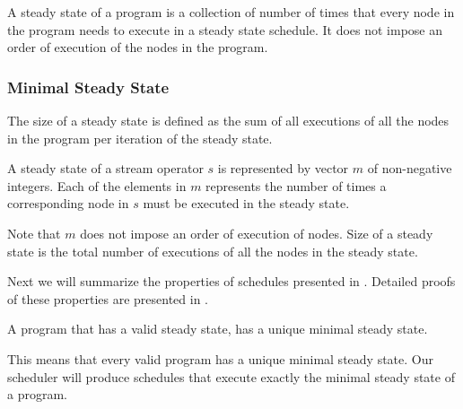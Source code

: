 A steady state of a program is a collection of number of times
that every node in the program needs to execute in a steady state
schedule.  It does not impose an order of execution of the nodes
in the program.
\begin{comment}
Not every {\StreamIt} program has a steady state schedule.  It is
possible for a program to have unbalanced production and
consumption of data in {\splitjoins} and {\feedbackloops}. The
amount of data buffered continually increases, and cannot be
reduced, thus making it impossible to create a steady state
schedule for them.  It is also possible that a {\feedbackloop}
does not have enough data buffered up internally in order to
complete execution of a full steady state, and thus deadlocks.
Programs without a valid steady state schedule are not considered
valid {\StreamIt} programs. In other words, all valid {\StreamIt}
programs have a steady state schedule.
\end{comment}

\subsubsection{Minimal Steady State}

The size of a steady state is defined as the sum of all executions
of all the nodes in the program per iteration of the steady state.

\begin{definition}
A steady state of a stream operator $s$ is represented by vector
$m$ of non-negative integers. Each of the elements in $m$
represents the number of times a corresponding node in $s$ must be
executed in the steady state.
\end{definition}

Note that $m$ does not impose an order of execution of nodes. Size
of a steady state is the total number of executions of all the
nodes in the steady state.

Next we will summarize the properties of schedules presented in
\cite{lee87static}. Detailed proofs of these properties are
presented in \cite{karczma-thesis}.

\begin{theorem}
A {\StreamIt} program that has a valid steady state, has a unique
minimal steady state.
\end{theorem}

This means that every valid {\StreamIt} program has a unique minimal
steady state. Our scheduler will produce schedules that execute
exactly the minimal steady state of a program.

